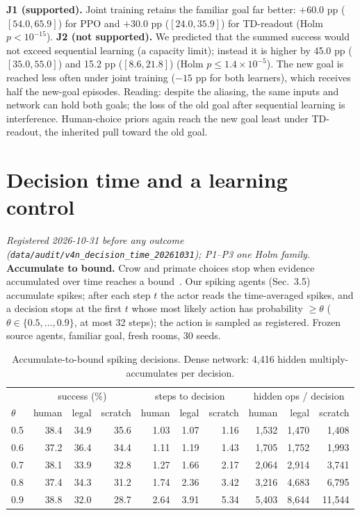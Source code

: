 \documentclass[10pt,onecolumn,letterpaper]{article}
\begin{document}
\textbf{J1 (supported).} Joint training retains the familiar goal far better: $+60.0$ pp ($[54.0,65.9]$) for PPO and
$+30.0$ pp ($[24.0,35.9]$) for TD-readout (Holm $p<10^{-15}$). \textbf{J2 (not supported).} We predicted that the summed
success would not exceed sequential learning (a capacity limit); instead it is higher by 45.0 pp ($[35.0,55.0]$) and
15.2 pp ($[8.6,21.8]$) (Holm $p\leq1.4\times10^{-5}$). The new goal is reached less often under joint training
($-15$ pp for both learners), which receives half the new-goal episodes. Reading: despite the aliasing, the same inputs
and network can hold both goals; the loss of the old goal after sequential learning is interference. Human-choice
priors again reach the new goal least under TD-readout, the inherited pull toward the old goal.

\section{Decision time and a learning control}
\label{sec:decision_time}
\textit{Registered 2026-10-31 before any outcome (\texttt{data/audit/v4n\_decision\_time\_20261031}); P1--P3 one Holm family.}
\textbf{Accumulate to bound.} Crow and primate choices stop when evidence accumulated over time reaches a
bound~\cite{schmidbauer2026crow}. Our spiking agents (Sec.~3.5) accumulate spikes; after each step $t$ the actor reads the
time-averaged spikes, and a decision stops at the first $t$ whose most likely action has probability $\ge\theta$
($\theta\in\{0.5,\dots,0.9\}$, at most 32 steps); the action is sampled as registered. Frozen source agents, familiar
goal, fresh rooms, 30 seeds.

\begin{table}[h]\centering\footnotesize\setlength{\tabcolsep}{3pt}
\begin{tabular}{@{}lrrrrrrrrr@{}}\toprule
 & \multicolumn{3}{c}{success (\%)} & \multicolumn{3}{c}{steps to decision} & \multicolumn{3}{c}{hidden ops / decision}\\
$\theta$ & human & legal & scratch & human & legal & scratch & human & legal & scratch\\\midrule
0.5 & 38.4 & 34.9 & 35.6 & 1.03 & 1.07 & 1.16 & 1,532 & 1,470 & 1,408\\
0.6 & 37.2 & 36.4 & 34.4 & 1.11 & 1.19 & 1.43 & 1,705 & 1,752 & 1,993\\
0.7 & 38.1 & 33.9 & 32.8 & 1.27 & 1.66 & 2.17 & 2,064 & 2,914 & 3,741\\
0.8 & 37.4 & 34.3 & 31.2 & 1.74 & 2.36 & 3.42 & 3,216 & 4,683 & 6,795\\
0.9 & 38.8 & 32.0 & 28.7 & 2.64 & 3.91 & 5.34 & 5,403 & 8,644 & 11,544\\
\bottomrule\end{tabular}
\caption{Accumulate-to-bound spiking decisions. Dense network: 4,416 hidden multiply-accumulates per decision.}\end{table}
\end{document}
